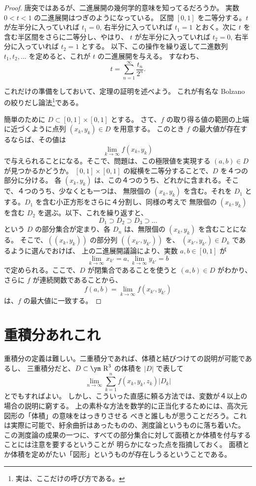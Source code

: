 \documentclass[a4paper]{jsarticle}
\theoremstyle{definition}
\theoremstyle{remark}
\newcommand{\R}{\text{\ym R}}
\begin{document}
\begin{proof}
唐突ではあるが、二進展開の幾何学的意味を知ってるだろうか。
実数 $0< t < 1$ の二進展開はつぎのようになっている。
区間 $[0,1]$ を二等分する。$t$ が左半分に入っていれば $t_1 = 0$, 右半分に入っていれば
$t_1 = 1$ とおく。次に $t$ を含む半区間をさらに二等分し、やはり、
$t$ が左半分に入っていれば $t_2 = 0$, 右半分に入っていれば $t_2 = 1$ とする。
以下、この操作を繰り返して二進数列 $t_1,t_2,\dots$ を定めると、これが $t$ の二進展開を与える。
すなわち、
\[
t = \sum_{n=1}^\infty \frac{t_n}{2^n}. 
\]

これだけの準備をしておいて、定理の証明を述べよう。
これが有名な Bolzano の絞りだし論法\footnote{実は、ここだけの呼び方である。}である。

簡単のために $D \subset [0,1]\times [0,1]$ とする。
さて、$f$ の取り得る値の範囲の上端に近づくように点列 $(x_k,y_k) \in D$ を用意する。
このとき $f$ の最大値が存在するならば、その値は
\[
\lim_{k \to \infty} f(x_k,y_k) 
\]
で与えられることになる。そこで、問題は、この極限値を実現する $(a,b) \in D$ が見つかるかどうか。
$[0,1]\times[0,1]$ の縦横を二等分することで、$D$ を４つの部分に分ける。
各 $(x_k,y_k)$ は、この４つのうち、どれかに含まれる。そこで、４つのうち、少なくとも一つは、
無限個の $(x_k,y_k)$ を含む。それを $D_1$ とする。$D_1$ を含む小正方形をさらに４分割し、同様の考えで
無限個の $(x_k,y_k)$ を含む $D_2$ を選ぶ。以下、これを繰り返すと、
\[
D_1 \supset D_2 \supset D_3 \supset \dots
\]
という $D$ の部分集合が定まり、各 $D_n$ は、無限個の $(x_k,y_k)$ を含むことになる。
そこで、$((x_k,y_k))$ の部分列 $((x_{k'},y_{k'}))$ を、
$(x_{k'},y_{k'}) \in D_k$ であるように選んでおけば、
上の二進展開議論により、実数 $a,b \in [0,1]$ が
\[
\lim_{k \to \infty} x_{k'} = a, 
\lim_{k \to \infty} y_{k'} = b 
\]
で定められる。ここで、$D$ が閉集合であることを使うと $(a,b) \in D$ がわかり、
さらに $f$ が連続関数であることから、
\[
f(a,b) = \lim_{k \to \infty} f(x_{k'},y_{k'})
\]
は、$f$ の最大値に一致する。
\end{proof}


\section{重積分あれこれ}%
重積分の定義は難しい。二重積分であれば、体積と結びつけての説明が可能であるし、
三重積分だと、$D \subset \R^3$ の体積を $|D|$ で表して
\[
\lim_{n \to \infty} \sum_{k=1}^n f(x_k,y_k,z_k) |D_k|
\]
とでもすればよい。
しかし、こういった直感に頼る方法では、変数が４以上の場合の説明に窮する。
上の素朴な方法を数学的に正当化するためには、高次元図形の「体積」の意味をはっきりさせる
べきと誰しもが思うことだろう。これは実際に可能で、紆余曲折はあったものの、測度論というものに落ち着いた。
この測度論の成果の一つに、すべての部分集合に対して面積とか体積を付与することには注意を要するということが
明らかになった点を指摘しておく。
面積とか体積を定めがたい「図形」というものが存在しうるということである。
\end{document}
